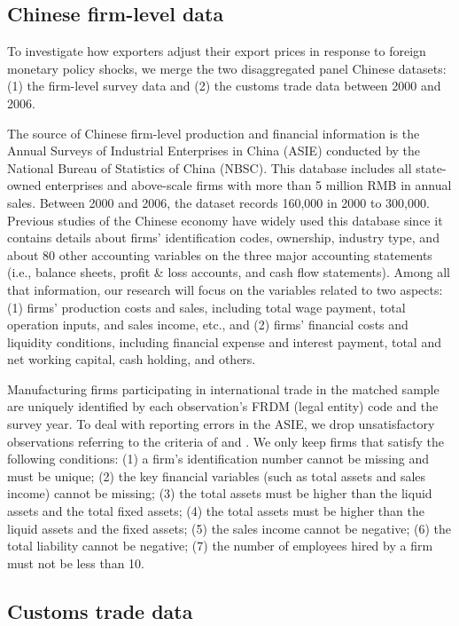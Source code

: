 \subsection{Chinese firm-level data}

To investigate how exporters adjust their export prices in response to foreign monetary policy shocks, we merge the two disaggregated panel Chinese datasets: (1) the firm-level survey data and (2) the customs trade data between 2000 and 2006.

The source of Chinese firm-level production and financial information is the Annual Surveys of Industrial Enterprises in China (ASIE) conducted by the National Bureau of Statistics of China (NBSC). This database includes all state-owned enterprises and above-scale firms with more than 5 million RMB in annual sales. Between 2000 and 2006, the dataset records 160,000 in 2000 to 300,000. Previous studies of the Chinese economy have widely used this database since it contains details about firms’ identification codes, ownership, industry type, and about 80 other accounting variables on the three major accounting statements (i.e., balance sheets, profit \& loss accounts, and cash flow statements). Among all that information, our research will focus on the variables related to two aspects: (1) firms' production costs and sales, including total wage payment, total operation inputs, and sales income, etc., and (2) firms' financial costs and liquidity conditions, including financial expense and interest payment, total and net working capital, cash holding, and others.

Manufacturing firms participating in international trade in the matched sample are uniquely identified by each observation's FRDM (legal entity) code and the survey year. To deal with reporting errors in the ASIE, we drop unsatisfactory observations referring to the criteria of \cite{fan2015credit} and \cite{brooks2021agglomeration}. We only keep firms that satisfy the following conditions: (1) a firm’s identification number cannot be missing and must be unique; (2) the key financial variables (such as total assets and sales income) cannot be missing;  (3) the total assets must be higher than the liquid assets and the total fixed assets; (4) the total assets must be higher than the liquid assets and the fixed assets; (5) the sales income cannot be negative; (6) the total liability cannot be negative; (7) the number of employees hired by a firm must not be less than 10.

\subsection{Customs trade data}

